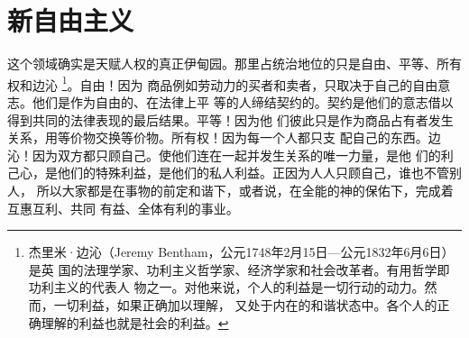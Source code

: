 \chapter{新自由主义}

这个领域确实是天赋人权的真正伊甸园。那里占统治地位的只是自由、平等、所有权和边沁
\footnote{杰里米·边沁（Jeremy Bentham，公元1748年2月15日—公元1832年6月6日）是英
  国的法理学家、功利主义哲学家、经济学家和社会改革者。有用哲学即功利主义的代表人
  物之一。对他来说，个人的利益是一切行动的动力。然而，一切利益，如果正确加以理解，
  又处于内在的和谐状态中。各个人的正确理解的利益也就是社会的利益。}。自由！因为
商品例如劳动力的买者和卖者，只取决于自己的自由意志。他们是作为自由的、在法律上平
等的人缔结契约的。契约是他们的意志借以得到共同的法律表现的最后结果。平等！因为他
们彼此只是作为商品占有者发生关系，用等价物交换等价物。所有权！因为每一个人都只支
配自己的东西。边沁！因为双方都只顾自己。使他们连在一起并发生关系的唯一力量，是他
们的利己心，是他们的特殊利益，是他们的私人利益。正因为人人只顾自己，谁也不管别人，
所以大家都是在事物的前定和谐下，或者说，在全能的神的保佑下，完成着互惠互利、共同
有益、全体有利的事业。